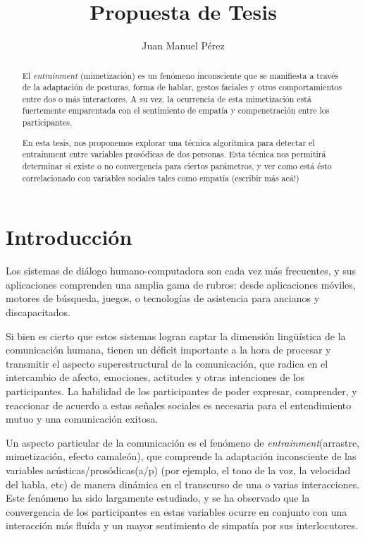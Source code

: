 \documentclass[a4paper,11pt]{article}
\title{Propuesta de Tesis}
\author{Juan Manuel Pérez}
\begin{document}
\maketitle

\begin{abstract}

El \emph{entrainment} (mimetización) es un fenómeno inconsciente que se manifiesta a través de la adaptación de posturas, forma de hablar, gestos faciales y otros comportamientos entre dos o más interactores. A su vez, la ocurrencia de esta mimetización está fuertemente emparentada con el sentimiento de empatía y compenetración entre los participantes.

En esta tesis, nos proponemos explorar una técnica algorítmica para detectar el entrainment entre variables prosódicas de dos personas. Esta técnica nos permitirá determinar si existe o no convergencia para ciertos parámetros, y ver como está ésto correlacionado con variables sociales tales como empatía (escribir más acá!)


\end{abstract}


\section{Introducción}

Los sistemas de diálogo humano-computadora son cada vez más frecuentes, y sus aplicaciones comprenden una amplia gama de rubros: desde aplicaciones móviles, motores de búsqueda, juegos, o tecnologías de asistencia para ancianos y discapacitados.

Si bien es cierto que estos sistemas logran captar la dimensión lingüística de la comunicación humana, tienen un déficit importante a la hora de procesar y transmitir el aspecto superestructural de la comunicación, que radica en el intercambio de afecto, emociones, actitudes y otras intenciones de los participantes. La habilidad de los participantes de poder expresar, comprender, y reaccionar de acuerdo a estas señales sociales es necesaria para el entendimiento mutuo y una comunicación exitosa.

Un aspecto particular de la comunicación es el fenómeno de \emph{entrainment}(arrastre, mimetización, efecto camaleón), que comprende la adaptación inconsciente de las variables acústicas/prosódicas(a/p) (por ejemplo, el tono de la voz, la velocidad del habla, etc) de manera dinámica en el transcurso de una o varias interacciones. Este fenómeno ha sido largamente estudiado, y se ha observado que la convergencia de los participantes en estas variables ocurre en conjunto con una interacción más fluída y un mayor sentimiento de simpatía por sus interlocutores.
\end{document}
